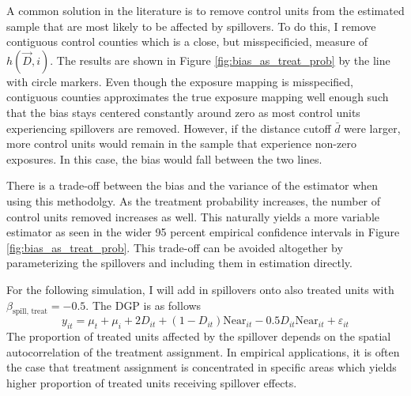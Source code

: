 \documentclass[11pt]{article}
\begin{document}
A common solution in the literature is to remove control units from the estimated sample that are most likely to be affected by spillovers. To do this, I remove contiguous control counties which is a close, but misspecificied, measure of $h(\vec{D}, i)$. The results are shown in Figure \ref{fig:bias_as_treat_prob} by the line with circle markers. Even though the exposure mapping is misspecified, contiguous counties approximates the true exposure mapping well enough such that the bias stays centered constantly around zero as most control units experiencing spillovers are removed. However, if the distance cutoff $\bar{d}$ were larger, more control units would remain in the sample that experience non-zero exposures. In this case, the bias would fall between the two lines.

There is a trade-off between the bias and the variance of the estimator when using this methodolgy. As the treatment probability increases, the number of control units removed increases as well. This naturally yields a more variable estimator as seen in the wider 95 percent empirical confidence intervals in Figure \ref{fig:bias_as_treat_prob}. This trade-off can be avoided altogether by parameterizing the spillovers and including them in estimation directly.

For the following simulation, I will add in spillovers onto also treated units with $\beta_{\text{spill, treat}} = -0.5$. The DGP is as follows 
\begin{equation}\label{eq:dgp2} 
    y_{it} = \mu_t + \mu_i + 2 D_{it} + (1-D_{it}) \text{Near}_{it} - 0.5 D_{it} \text{Near}_{it} + \varepsilon_{it}   
\end{equation} 
The proportion of treated units affected by the spillover depends on the spatial autocorrelation of the treatment assignment. In empirical applications, it is often the case that treatment assignment is concentrated in specific areas which yields higher proportion of treated units receiving spillover effects.
\end{document}
